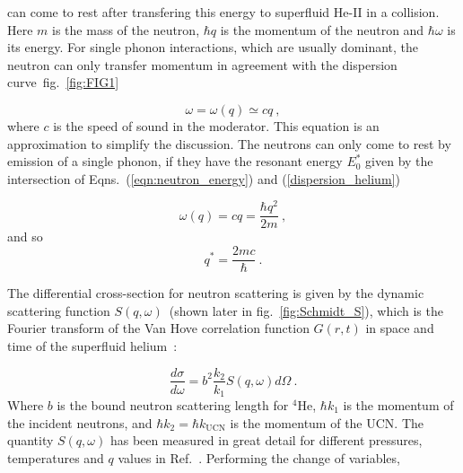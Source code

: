 can come to rest after transfering this energy to superfluid He-II in
a collision. Here $m$ is the mass of the neutron, $\hbar q$ is the
momentum of the neutron and $\hbar \omega$ is its energy.
For single phonon interactions, which are usually dominant, the
neutron can only transfer momentum in agreement with the dispersion
curve~fig.~\ref{fig:FIG1}

\begin{equation}
\label{dispersion_helium}
\omega=\omega(q) \simeq cq~,
\end{equation}
where $c$ is the speed of sound in the moderator. This equation is an
approximation to simplify the discussion. The neutrons can only come
to rest by emission of a single phonon, if they have the resonant
energy $E_0^*$ given by the intersection of
Eqns.~(\ref{eqn:neutron_energy}) and (\ref{dispersion_helium})

\begin{equation}
\omega(q)=cq=\frac{\hbar q^2}{2m}~,
\end{equation}
and so
\begin{equation}
q^*=\frac{2mc}{\hbar}~.
\end{equation}


The differential cross-section for neutron scattering is given by the
dynamic scattering function $S(q,\omega)$~(shown later in
fig.~\ref{fig:Schmidt_S}), which is the Fourier transform of the Van
Hove correlation function $G(r,t)$ in space and time of the superfluid
helium~\cite{Squires}:

\begin{equation}
\frac{d\sigma}{d\omega}=b^2 \frac{k_2}{k_1}S(q,\omega) d\Omega~.
\end{equation}
Where $b$ is the bound neutron scattering length for $^4$He,
$\hbar k_1$ is the momentum of the incident neutrons, and
$\hbar k_2=\hbar k_{\text{UCN}}$ is the momentum of the UCN. The
quantity $S(q,\omega)$ has been measured in great detail for different
pressures, temperatures and $q$ values in
Ref.~\cite{S_func1,gibbs1999collective,S_func3}. Performing the change
of variables,

